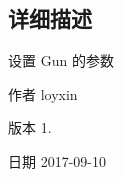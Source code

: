 \subsection{详细描述}
设置 Gun 的参数 

\begin{DoxyAuthor}{作者}
loyxin 
\end{DoxyAuthor}
\begin{DoxyVersion}{版本}
1. 
\end{DoxyVersion}
\begin{DoxyDate}{日期}
2017-\/09-\/10 
\end{DoxyDate}
